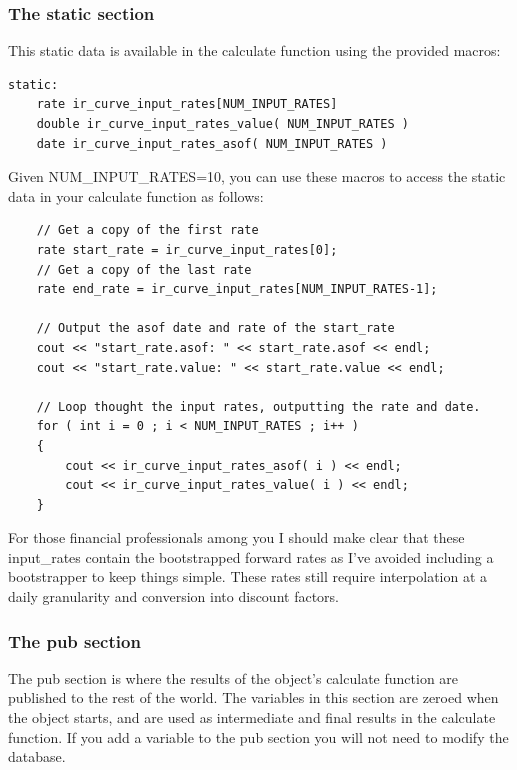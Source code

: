 \documentclass{report}
\begin{document}
\subsubsection{The static section}

This static data is available in the calculate function using the provided macros:

\begin{verbatim}
static:
    rate ir_curve_input_rates[NUM_INPUT_RATES]
    double ir_curve_input_rates_value( NUM_INPUT_RATES )
    date ir_curve_input_rates_asof( NUM_INPUT_RATES )
\end{verbatim}

Given NUM_INPUT_RATES=10, you can use these macros to access the static data in your calculate function as follows:

\begin{verbatim}
    // Get a copy of the first rate
    rate start_rate = ir_curve_input_rates[0];
    // Get a copy of the last rate
    rate end_rate = ir_curve_input_rates[NUM_INPUT_RATES-1];

    // Output the asof date and rate of the start_rate
    cout << "start_rate.asof: " << start_rate.asof << endl;
    cout << "start_rate.value: " << start_rate.value << endl;

    // Loop thought the input rates, outputting the rate and date.
    for ( int i = 0 ; i < NUM_INPUT_RATES ; i++ )
    {
        cout << ir_curve_input_rates_asof( i ) << endl;
        cout << ir_curve_input_rates_value( i ) << endl;
    }
\end{verbatim}

For those financial professionals among you I should make clear that these input_rates contain the bootstrapped forward rates as I've avoided including a bootstrapper to keep things simple. These rates still require interpolation at a daily granularity and conversion into discount factors.

\subsubsection{The pub section}

The pub section is where the results of the object's calculate function are published to the rest of the world. The variables in this section are zeroed when the object starts, and are used as intermediate and final results in the calculate function. If you add a variable to the pub section you will not need to modify the database.  
\end{document}
